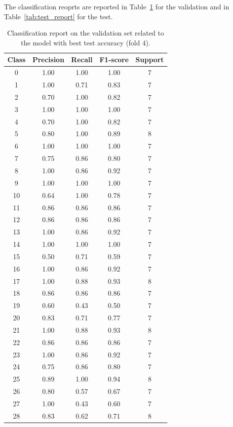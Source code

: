 \documentclass{article}
\begin{document}
\begin{sloppy}
The classification reoprts are reported in Table~\ref{tab:validation_report}
for the validation and in Table~\ref{tab:test_report} for the test.
\begin{table}[ht]
  \centering
  \caption{Classification report on the validation set related to the model with best test accuracy (fold 4).}
  \label{tab:validation_report}
\begin{tabular}{|c|c|c|c|c|}
  \hline
  Class & Precision & Recall & F1-score & Support \\
  \hline
  0  & 1.00 & 1.00 & 1.00 & 7 \\
  1  & 1.00 & 0.71 & 0.83 & 7 \\
  2  & 0.70 & 1.00 & 0.82 & 7 \\
  3  & 1.00 & 1.00 & 1.00 & 7 \\
  4  & 0.70 & 1.00 & 0.82 & 7 \\
  5  & 0.80 & 1.00 & 0.89 & 8 \\
  6  & 1.00 & 1.00 & 1.00 & 7 \\
  7  & 0.75 & 0.86 & 0.80 & 7 \\
  8  & 1.00 & 0.86 & 0.92 & 7 \\
  9  & 1.00 & 1.00 & 1.00 & 7 \\
  10 & 0.64 & 1.00 & 0.78 & 7 \\
  11 & 0.86 & 0.86 & 0.86 & 7 \\
  12 & 0.86 & 0.86 & 0.86 & 7 \\
  13 & 1.00 & 0.86 & 0.92 & 7 \\
  14 & 1.00 & 1.00 & 1.00 & 7 \\
  15 & 0.50 & 0.71 & 0.59 & 7 \\
  16 & 1.00 & 0.86 & 0.92 & 7 \\
  17 & 1.00 & 0.88 & 0.93 & 8 \\
  18 & 0.86 & 0.86 & 0.86 & 7 \\
  19 & 0.60 & 0.43 & 0.50 & 7 \\
  20 & 0.83 & 0.71 & 0.77 & 7 \\
  21 & 1.00 & 0.88 & 0.93 & 8 \\
  22 & 0.86 & 0.86 & 0.86 & 7 \\
  23 & 1.00 & 0.86 & 0.92 & 7 \\
  24 & 0.75 & 0.86 & 0.80 & 7 \\
  25 & 0.89 & 1.00 & 0.94 & 8 \\
  26 & 0.80 & 0.57 & 0.67 & 7 \\
  27 & 1.00 & 0.43 & 0.60 & 7 \\
  28 & 0.83 & 0.62 & 0.71 & 8 \\

\end{tabular}
\end{table}
\end{sloppy}
\end{document}
